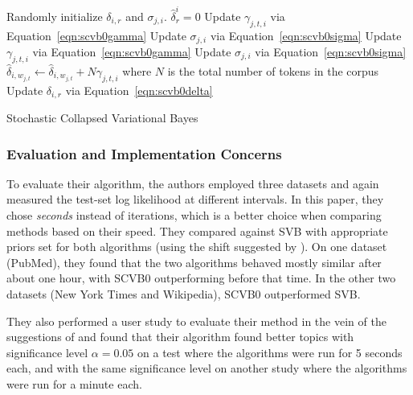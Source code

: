 \documentclass[11pt]{article}
\begin{document}
\begin{algorithm}
  \begin{algorithmic}
    \State Randomly initialize $\delta_{i,r}$ and $\sigma_{j,i}$.
      \State $\hat{\delta}_r^i = 0$
            \State Update $\gamma_{j,t,i}$ via Equation~\ref{eqn:scvb0gamma}
            \State Update $\sigma_{j,i}$ via Equation~\ref{eqn:scvb0sigma}
          \EndFor
        \EndFor
          \State Update $\gamma_{j,t,i}$ via Equation~\ref{eqn:scvb0gamma}
          \State Update $\sigma_{j,i}$ via Equation~\ref{eqn:scvb0sigma}
          \State $\hat{\delta}_{i, w_{j,t}} \leftarrow \hat{\delta}_{i, w_{j,t}} +
          N\gamma_{j,t,i}$ where $N$ is the total number of tokens in the
          corpus
        \EndFor
        \State Update $\delta_{i,r}$ via Equation~\ref{eqn:scvb0delta}
      \EndFor
    \EndFor
  \end{algorithmic}
  \caption{Stochastic Collapsed Variational Bayes}
  \label{alg:scvb0}
\end{algorithm}

\subsubsection{Evaluation and Implementation Concerns}

To evaluate their algorithm, the authors employed three datasets and again
measured the test-set log likelihood at different intervals. In this paper,
they chose \emph{seconds} instead of iterations, which is a better choice
when comparing methods based on their speed. They compared against SVB with
appropriate priors set for both algorithms (using the shift suggested
by \citet{Asuncion:2009:onsmoothing}). On one dataset (PubMed), they found
that the two algorithms behaved mostly similar after about one hour, with
SCVB0 outperforming before that time. In the other two datasets (New York
Times and Wikipedia), SCVB0 outperformed SVB.

They also performed a user study to evaluate their method in the vein of
the suggestions of \citet{Chang:2009:tealeaves} and found that their
algorithm found better topics with significance level $\alpha = 0.05$ on a
test where the algorithms were run for 5 seconds each, and with the same
significance level on another study where the algorithms were run for a
minute each.
\end{document}

